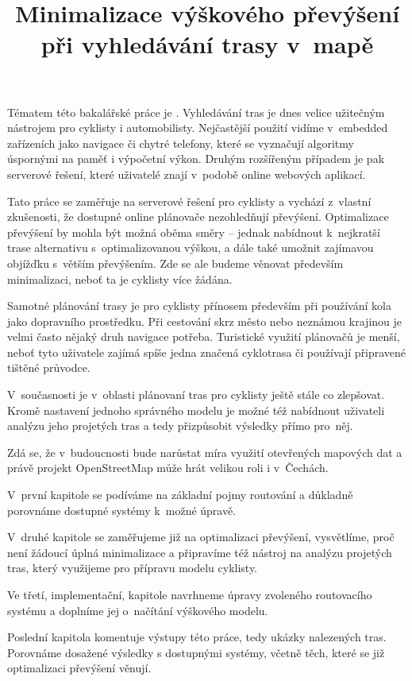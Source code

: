 \documentclass[thesis=B,czech]{FITthesis}[2012/06/26]
\title{Minimalizace výškového převýšení při vyhledávání trasy v~mapě}
\begin{document}


\begin{introduction}

Tématem této bakalářské práce je . Vyhledávání tras je dnes velice užitečným nástrojem pro cyklisty i automobilisty. Nejčastější použití vidíme v~embedded zařízeních jako navigace či chytré telefony, které se vyznačují algoritmy úspornými na paměť i výpočetní výkon. Druhým rozšířeným případem je pak serverové řešení, které uživatelé znají v~podobě online webových \mbox{aplikací}.

Tato práce se zaměřuje na serverové řešení pro cyklisty a vychází z~vlastní zkušenosti, že dostupné online plánovače nezohledňují převýšení. Optimalizace převýšení by mohla být možná oběma směry – jednak nabídnout k~nejkratší trase alternativu s~optimalizovanou výškou, a dále také umožnit zajímavou objížďku s~větším převýšením. Zde se ale budeme věnovat především minimalizaci, neboť ta je cyklisty více žádána.

Samotné plánování trasy je pro cyklisty přínosem především při používání kola jako dopravního prostředku. Při cestování skrz město nebo neznámou krajinou je velmi často nějaký druh navigace potřeba. Turistické využití plánovačů je menší, neboť tyto uživatele zajímá spíše jedna značená cyklotrasa či používají připravené tištěné průvodce.

V~současnosti je v~oblasti plánovaní tras pro cyklisty ještě stále co zlepšovat. Kromě nastavení jednoho správného modelu je možné též nabídnout uživateli analýzu jeho projetých tras a tedy přizpůsobit výsledky přímo pro~něj.

Zdá se, že v~budoucnosti bude narůstat míra využití otevřených mapových dat a právě projekt OpenStreetMap může hrát velikou roli i v~Čechách. 

V~první kapitole se podíváme na základní pojmy routování a důkladně porovnáme dostupné systémy k~možné úpravě.

V~druhé kapitole se zaměřujeme již na optimalizaci převýšení, vysvětlíme, proč není žádoucí úplná minimalizace a připravíme též nástroj na analýzu projetých tras, který využijeme pro přípravu modelu cyklisty.

Ve třetí, implementační, kapitole navrhneme úpravy zvoleného routovacího systému a doplníme jej o~načítání výškového modelu.

Poslední kapitola komentuje výstupy této práce, tedy ukázky nalezených tras. Porovnáme dosažené výsledky s dostupnými systémy, včetně těch, které se již optimalizaci převýšení věnují.



\end{introduction}
\end{document}

